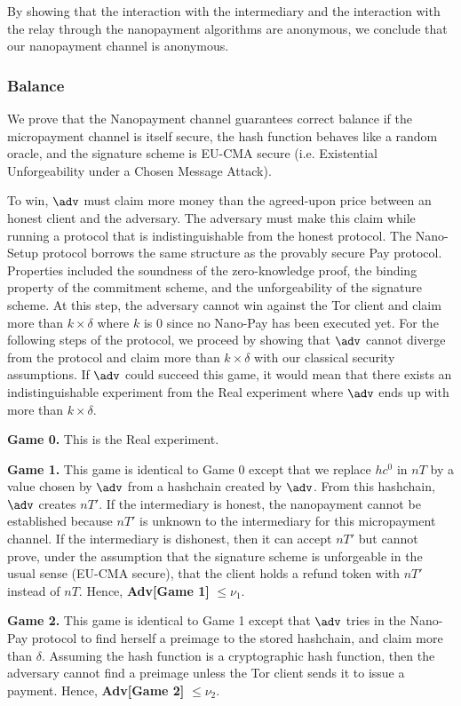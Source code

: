 By showing that the interaction with the intermediary and the interaction with the relay through the nanopayment algorithms are anonymous, we conclude that our nanopayment channel is anonymous.

\subsubsection{Balance}

We prove that the Nanopayment channel guarantees correct balance if the micropayment channel is itself secure, the hash function behaves like a random oracle, and the signature scheme is EU-CMA secure (i.e. Existential Unforgeability under a Chosen Message Attack).

To win, $\adv$ must claim more money than the agreed-upon price between an honest client and the adversary.
The adversary must make this claim while running a protocol that is indistinguishable from the honest protocol.
The Nano-Setup protocol borrows the same structure as the provably secure Pay protocol.
Properties included the soundness of the zero-knowledge proof, the binding property of the commitment scheme, and the unforgeability of the signature scheme.
At this step, the adversary cannot win against the Tor client and claim more than $k \times \delta$ where $k$ is 0 since no Nano-Pay has been executed yet.
For the following steps of the protocol, we proceed by showing that $\adv$ cannot diverge from the protocol and claim more than $k \times \delta$ with our classical security assumptions.
If $\adv$ could succeed this game, it would mean that there exists an indistinguishable experiment from the Real experiment where $\adv$ ends up with more than $k \times \delta$.

\textbf{Game 0.} This is the Real experiment.

\textbf{Game 1.}
This game is identical to Game 0 except that we replace $hc^0$ in $nT$ by a value chosen by $\adv$ from a hashchain created by $\adv$.
From this hashchain, $\adv$ creates $nT'$.
If the intermediary is honest, the nanopayment cannot be established because $nT'$ is unknown to the intermediary for this micropayment channel.
If the intermediary is dishonest, then it can accept $nT'$ but cannot prove, under the assumption that the signature scheme is unforgeable in the usual sense (EU-CMA secure), that the client holds a refund token with $nT'$ instead of $nT$.
Hence, \textbf{Adv[Game 1]} $\leq \nu_1$.

\textbf{Game 2.}
This game is identical to Game 1 except that $\adv$ tries in the Nano-Pay protocol to find herself a preimage to the stored hashchain, and claim more than $\delta$.
Assuming the hash function is a cryptographic hash function, then the adversary cannot find a preimage unless the Tor client sends it to issue a payment.
Hence, \textbf{Adv[Game 2]} $\leq \nu_2$.


